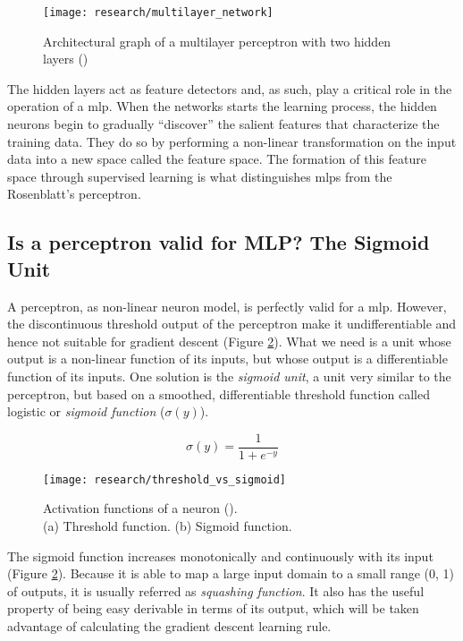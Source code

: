\begin{figure}[!ht]
	\centering
	\texttt{[image: research/multilayer\_network]}
	\caption{Architectural graph of a multilayer perceptron with two hidden layers (\cite{haykin2009neural})}
	\label{fig:mlp_architectural_graph}
\end{figure}

The hidden layers act as feature detectors and, as such, play a critical role in the operation of a \gls{mlp}. When the networks starts the learning process, the hidden neurons begin to gradually “discover” the salient features that characterize the training data. They do so by performing a non-linear transformation on
the input data into a new space called the feature space. The formation of this feature space through supervised learning is what distinguishes \glspl{mlp} from the Rosenblatt’s perceptron.

	\subsection{Is a perceptron valid for MLP? The Sigmoid Unit}
	A perceptron, as non-linear neuron model, is perfectly valid for a \gls{mlp}. However, the discontinuous threshold output of the perceptron make it undifferentiable and hence not suitable for gradient descent (Figure \ref{fig:threshold_vs_sigmoid}). What we need is a unit whose output is a non-linear function of its inputs, but whose output is a differentiable function of its inputs. One solution is the \textit{sigmoid unit}, a unit very similar to the perceptron, but based on a smoothed, differentiable threshold function called logistic or \textit{sigmoid function} ($\sigma(y)$).

		\begin{equation}
			\label{sigmoid_function}
			\sigma(y) = \frac{1}{1+e^{-y}}
		\end{equation}


	\begin{figure}[!ht]
		\centering
		\vspace{0.3cm}
		\texttt{[image: research/threshold\_vs\_sigmoid]}
		\caption
		{
			Activation functions of a neuron (\cite{haykin2009neural}). \\
			(a) Threshold function. \hspace{1.5cm} (b) Sigmoid function.
		}
		\label{fig:threshold_vs_sigmoid}
	\end{figure}

	The sigmoid function increases monotonically and continuously with its input (Figure \ref{fig:threshold_vs_sigmoid}). Because it is able to map a large input domain to a small range (0, 1) of outputs, it is usually referred as \textit{squashing function}. It also has the useful property of being easy derivable in terms of its output, which will be taken advantage of calculating the gradient descent learning rule.

